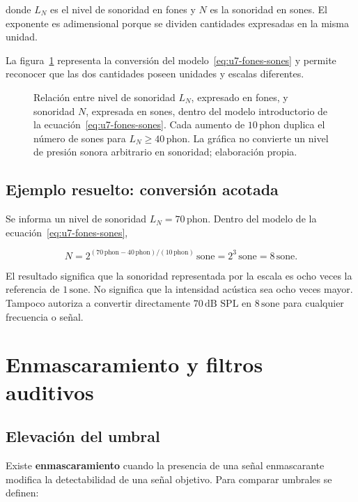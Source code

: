 donde \(L_N\) es el nivel de sonoridad en fones y \(N\) es la sonoridad en
sones. El exponente es adimensional porque se dividen cantidades expresadas en
la misma unidad.

La figura~\ref{fig:u7-fones-sones} representa la conversión del
modelo~\eqref{eq:u7-fones-sones} y permite reconocer que las dos cantidades
poseen unidades y escalas diferentes.

\begin{figure}[htbp]
    \centering
    
    \caption{Relación entre nivel de sonoridad \(L_N\), expresado en fones, y
    sonoridad \(N\), expresada en sones, dentro del modelo introductorio de la
    ecuación~\eqref{eq:u7-fones-sones}. Cada aumento de
    \(10\,\text{phon}\) duplica el número de sones para
    \(L_N\geq40\,\text{phon}\). La gráfica no convierte un nivel de presión
    sonora arbitrario en sonoridad; elaboración propia.}
    \label{fig:u7-fones-sones}
\end{figure}

\subsection{Ejemplo resuelto: conversión acotada}
\label{sec:u7-ejemplo-sones}

Se informa un nivel de sonoridad \(L_N=70\,\text{phon}\). Dentro del modelo de
la ecuación~\eqref{eq:u7-fones-sones},

\[
    N
      =2^{(70\,\text{phon}-40\,\text{phon})/(10\,\text{phon})}
       \,\text{sone}
      =2^3\,\text{sone}
      =8\,\text{sone}.
\]

El resultado significa que la sonoridad representada por la escala es ocho
veces la referencia de \(1\,\text{sone}\). No significa que la intensidad
acústica sea ocho veces mayor. Tampoco autoriza a convertir directamente
\(70\,\text{dB SPL}\) en \(8\,\text{sone}\) para cualquier frecuencia o
señal.

\section{Enmascaramiento y filtros auditivos}
\label{sec:u7-enmascaramiento}

\subsection{Elevación del umbral}
\label{sec:u7-elevacion-umbral}

Existe \textbf{enmascaramiento} cuando la presencia de una señal
enmascarante modifica la detectabilidad de una señal objetivo. Para comparar
umbrales se definen:

